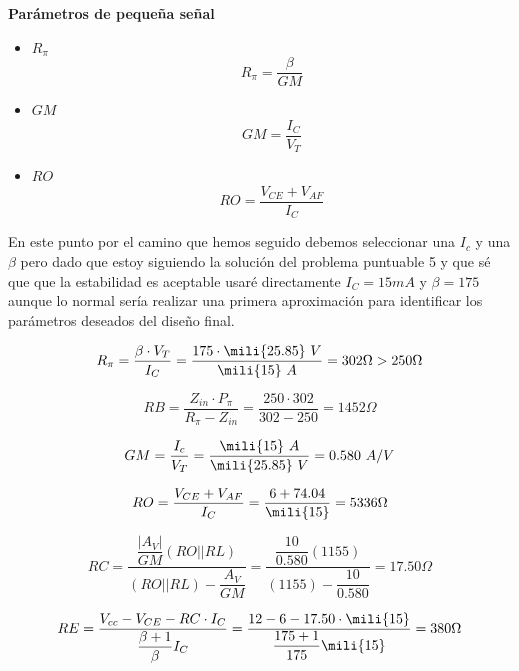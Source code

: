 \begin{center}
  \large\textbf{Parámetros de pequeña señal}
\end{center}

\begin{itemize}
\item $R_{\pi}$
  \[R_{\pi} = \dfrac{\beta}{GM}\]
\item $GM$
  \[GM   = \dfrac{I_C}{V_T}\]
  \item $RO$
    \[RO= \dfrac{V_{CE}+V_{AF}}{I_C}\]
\end{itemize}

En este punto por el camino que hemos seguido debemos seleccionar una
$I_c$ y una $\beta$ pero dado que estoy siguiendo la solución del
problema puntuable 5 y que sé que que la estabilidad es aceptable
usaré directamente $I_C = 15 mA$ y  $\beta=175$ aunque lo normal
sería realizar una primera aproximación para identificar los
parámetros deseados del diseño final.

\begin{equation}
R_{\pi} = \dfrac{\beta \cdot V_T}{I_C}=\dfrac{175\cdot
\mili{25.85}\ V}{\mili{15} \ A} = 302 \Omega > 250 \Omega
\end{equation}

\begin{equation}
RB = \dfrac{Z_{in} \cdot P_{\pi}}{R_{\pi}-Z_{in}} = \dfrac{250 \cdot
302}{302-250} = 1452 \Omega 
\end{equation}

\begin{equation}
  GM = \dfrac{I_c}{V_T} = \dfrac{\mili{15}\ A}{\mili{25.85}\ V} =
  0.580 \ A/V
\end{equation}

\begin{equation}
RO = \dfrac{V_{CE}+V_{AF}}{I_C} = \dfrac{6+74.04}{\mili{15}} = 5336 \Omega
\end{equation}

\begin{equation}
RC = \dfrac{\dfrac{|A_V|}{GM}\left(RO||RL\right)}{\left(RO||RL\right)-\dfrac{A_V}{GM}}
= \dfrac{\dfrac{10}{0.580}(1155)}{(1155)-\dfrac{10}{0.580}} = 17.50 \Omega
\end{equation}

\begin{equation}
RE = \dfrac{V_{cc}-V_{CE}-RC\cdot I_C}{\dfrac{\beta+1}{\beta} I_C} =
\dfrac{12-6-17.50\cdot \mili{15}}{\dfrac{175+1}{175}\mili{15}} = 380
\Omega 
\end{equation}

